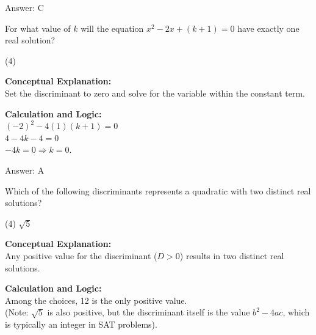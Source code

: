 \documentclass[11pt,paper=a4,answers]{exam}
\begin{document}
\begin{questions}
\begin{solution}
Answer: \colorbox{yellow!100}{C}
\end{solution}

\vspace{40pt}

\question
For what value of $k$ will the equation $x^2 - 2x + (k + 1) = 0$ have exactly one real solution?
\begin{tasks}(4)
\end{tasks}

\begin{solution}
\textbf{Conceptual Explanation:} \\
Set the discriminant to zero and solve for the variable within the constant term.

\vspace{20pt}

\textbf{Calculation and Logic:} \\
$(-2)^2 - 4(1)(k + 1) = 0$ \\
$4 - 4k - 4 = 0$ \\
$-4k = 0 \Rightarrow k = 0$.

\vspace{25pt}

Answer: \colorbox{yellow!100}{A}
\end{solution}

\vspace{40pt}

\question
Which of the following discriminants represents a quadratic with two distinct real solutions?
\begin{tasks}(4)
    \task $\sqrt{5}$
\end{tasks}

\begin{solution}
\textbf{Conceptual Explanation:} \\
Any positive value for the discriminant ($D > 0$) results in two distinct real solutions.

\vspace{20pt}

\textbf{Calculation and Logic:} \\
Among the choices, 12 is the only positive value. \\
(Note: $\sqrt{5}$ is also positive, but the discriminant itself is the value $b^2 - 4ac$, which is typically an integer in SAT problems).


\end{solution}
\end{questions}
\end{document}

